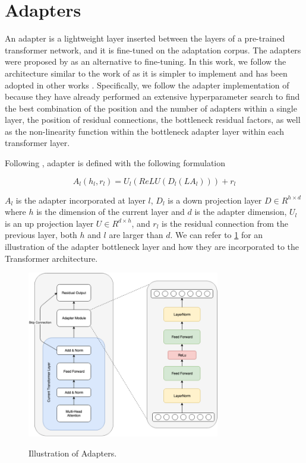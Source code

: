 \section{Adapters}
\label{sec:bm_adapters}
An adapter is a lightweight layer inserted between the layers of a pre-trained transformer network, and it is fine-tuned on the adaptation corpus. The adapters were proposed by  as an alternative to fine-tuning. In this work, we follow the architecture similar to the work of  as it is simpler to implement and has been adopted in other works . Specifically, we follow the adapter implementation of  because they have already performed an extensive hyperparameter search to find the best combination of the position and the number of adapters within a single layer, the position of residual connections, the bottleneck residual factors, as well as the non-linearity function within the bottleneck adapter layer within each transformer layer.

Following , adapter is defined with the following formulation

$$A_l(h_l, r_l) = U_l(ReLU(D_l(LA_l))) + r_l $$

$A_l$ is the adapter incorporated at layer $l$, $D_l$ is a down projection layer $D \in R^{h \times d}$ where $h$ is the dimension of the current layer and $d$ is the adapter dimension, $U_l$ is an up projection layer $U \in R^{d \times h}$, and $r_l$ is the residual connection from the previous layer, both $h$ and $l$ are larger than $d$. We can refer to \cref{img:adapters} for an illustration of the adapter bottleneck layer and how they are incorporated to the Transformer architecture.

\begin{figure}[h]
    {\includegraphics[width=0.75\textwidth]{img/adapter_module.png}}
    \centering
    \caption{Illustration of Adapters.}
    \label{img:adapters}
\end{figure}

